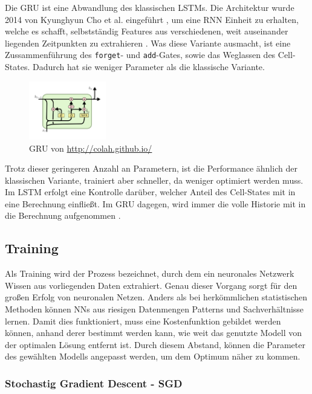\documentclass[pdftex,a4paper,halfparskip, article]{scrartcl}
\begin{document}
Die GRU ist eine Abwandlung des klassischen LSTMs. Die Architektur wurde 2014 von Kyunghyun Cho et al. eingeführt \cite{DBLP:journals/corr/ChoMGBSB14}, um eine RNN Einheit zu erhalten, welche es schafft, selbstständig Features aus verschiedenen, weit auseinander liegenden Zeitpunkten zu extrahieren \cite{paperGRUComparison}. Was diese Variante ausmacht, ist eine Zussammenführung des \texttt{forget}- und \texttt{add}-Gates, sowie das Weglassen des Cell-States. Dadurch hat sie weniger Parameter als die klassische Variante.
\begin{figure}[h]
\centering
\includegraphics[width=0.3\textwidth]{colah_gru_small}
\caption{GRU von \url{http://colah.github.io/}}
\end{figure}
Trotz dieser geringeren Anzahl an Parametern, ist die Performance ähnlich der klassischen Variante\cite{lstmSearchSpace}, trainiert aber schneller, da weniger optimiert werden muss.  Im LSTM erfolgt eine Kontrolle darüber, welcher Anteil des Cell-States mit in eine Berechnung einfließt. Im GRU dagegen, wird immer die volle Historie mit in die Berechnung aufgenommen \cite{paperGRUComparison}. 


\subsection{Training}

Als Training wird der Prozess bezeichnet, durch dem ein neuronales Netzwerk Wissen aus vorliegenden Daten extrahiert. Genau dieser Vorgang sorgt für den großen Erfolg von neuronalen Netzen. Anders als bei herkömmlichen statistischen Methoden können NNs aus riesigen Datenmengen Patterns und Sachverhältnisse lernen. Damit dies funktioniert, muss eine Kostenfunktion gebildet werden können, anhand derer bestimmt werden kann, wie weit das genutzte Modell von der optimalen Lösung entfernt ist. Durch diesem Abstand, können die Parameter des gewählten Modells angepasst werden, um dem Optimum näher zu kommen.

\subsubsection{Stochastig Gradient Descent - SGD}
\end{document}
